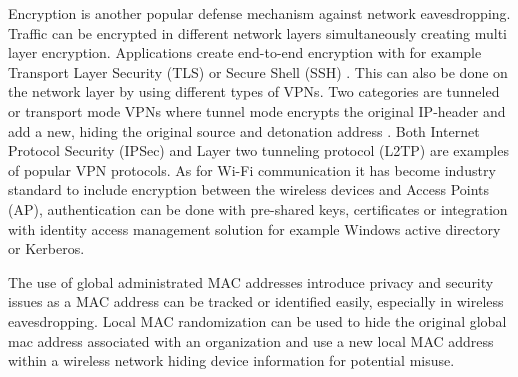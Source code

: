 Encryption is another popular defense mechanism against network eavesdropping. Traffic can be encrypted in different network layers simultaneously creating multi layer encryption. Applications create end-to-end encryption with for example Transport Layer Security (TLS) \cite{tls_rfc} or Secure Shell (SSH) \cite{ssh_rfc}. This can also be done on the network layer by using different types of VPNs. Two categories are tunneled or transport mode VPNs where tunnel mode encrypts the original IP-header and add a new, hiding the original source and detonation address \cite{ipsec_rfc} \cite{l2tp_rfc}. Both Internet Protocol Security (IPSec) \cite{ipsec_rfc} and Layer two tunneling protocol (L2TP) \cite{l2tp_rfc} are examples of popular VPN protocols. As for Wi-Fi communication it has become industry standard to include encryption between the wireless devices and Access Points (AP), authentication can be done with pre-shared keys, certificates or integration with identity access management solution for example Windows active directory or Kerberos. 

The use of global administrated MAC addresses introduce privacy and security issues as a MAC address can be tracked or identified easily, especially in wireless eavesdropping. Local MAC randomization \cite{ietf-madinas-mac-address-randomization-06} can be used to hide the original global mac address associated with an organization and use a new local MAC address within a wireless network hiding device information for potential misuse.



